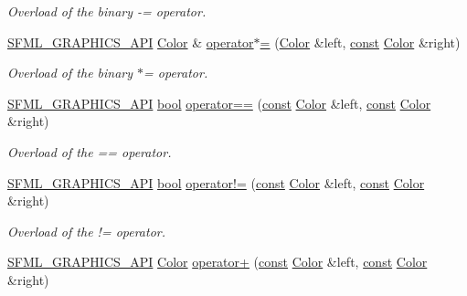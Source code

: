 \begin{DoxyCompactItemize}
\begin{DoxyCompactList}\small\item\em Overload of the binary -\/= operator. \end{DoxyCompactList}\item 
\hyperlink{sfml_2dep_2_s_f_m_l-2_84_82_2include_2_s_f_m_l_2_graphics_2_export_8hpp_ab84c9f1035e146917de3bc0f98d72b35}{S\-F\-M\-L\-\_\-\-G\-R\-A\-P\-H\-I\-C\-S\-\_\-\-A\-P\-I} \hyperlink{classsf_1_1_color}{Color} \& \hyperlink{classsf_1_1_color_a8953be58a47ced92fb25966d6ee90511}{operator$\ast$=} (\hyperlink{classsf_1_1_color}{Color} \&left, \hyperlink{term__entry_8h_a57bd63ce7f9a353488880e3de6692d5a}{const} \hyperlink{classsf_1_1_color}{Color} \&right)
\begin{DoxyCompactList}\small\item\em Overload of the binary $\ast$= operator. \end{DoxyCompactList}\item 
\hyperlink{sfml_2dep_2_s_f_m_l-2_84_82_2include_2_s_f_m_l_2_graphics_2_export_8hpp_ab84c9f1035e146917de3bc0f98d72b35}{S\-F\-M\-L\-\_\-\-G\-R\-A\-P\-H\-I\-C\-S\-\_\-\-A\-P\-I} \hyperlink{term__entry_8h_a002004ba5d663f149f6c38064926abac}{bool} \hyperlink{classsf_1_1_color_a7498d4670c7655e8d4d91ef49cc6064e}{operator==} (\hyperlink{term__entry_8h_a57bd63ce7f9a353488880e3de6692d5a}{const} \hyperlink{classsf_1_1_color}{Color} \&left, \hyperlink{term__entry_8h_a57bd63ce7f9a353488880e3de6692d5a}{const} \hyperlink{classsf_1_1_color}{Color} \&right)
\begin{DoxyCompactList}\small\item\em Overload of the == operator. \end{DoxyCompactList}\item 
\hyperlink{sfml_2dep_2_s_f_m_l-2_84_82_2include_2_s_f_m_l_2_graphics_2_export_8hpp_ab84c9f1035e146917de3bc0f98d72b35}{S\-F\-M\-L\-\_\-\-G\-R\-A\-P\-H\-I\-C\-S\-\_\-\-A\-P\-I} \hyperlink{term__entry_8h_a002004ba5d663f149f6c38064926abac}{bool} \hyperlink{classsf_1_1_color_a5d6501b7dd05f481b79f7163899f1d92}{operator!=} (\hyperlink{term__entry_8h_a57bd63ce7f9a353488880e3de6692d5a}{const} \hyperlink{classsf_1_1_color}{Color} \&left, \hyperlink{term__entry_8h_a57bd63ce7f9a353488880e3de6692d5a}{const} \hyperlink{classsf_1_1_color}{Color} \&right)
\begin{DoxyCompactList}\small\item\em Overload of the != operator. \end{DoxyCompactList}\item 
\hyperlink{sfml_2dep_2_s_f_m_l-2_84_82_2include_2_s_f_m_l_2_graphics_2_export_8hpp_ab84c9f1035e146917de3bc0f98d72b35}{S\-F\-M\-L\-\_\-\-G\-R\-A\-P\-H\-I\-C\-S\-\_\-\-A\-P\-I} \hyperlink{classsf_1_1_color}{Color} \hyperlink{classsf_1_1_color_a90e79ecc276114cda519a88119ac645b}{operator+} (\hyperlink{term__entry_8h_a57bd63ce7f9a353488880e3de6692d5a}{const} \hyperlink{classsf_1_1_color}{Color} \&left, \hyperlink{term__entry_8h_a57bd63ce7f9a353488880e3de6692d5a}{const} \hyperlink{classsf_1_1_color}{Color} \&right)

\end{DoxyCompactItemize}
